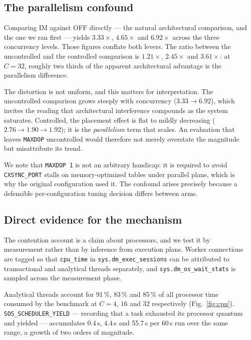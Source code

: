 \documentclass[conference,a4paper]{IEEEtran}
\begin{document}
\subsection{The parallelism confound}
\label{sec:confound}

Comparing IM against OFF directly --- the natural architectural comparison, and
the one we ran first --- yields $3.33\times$, $4.65\times$ and $6.92\times$
across the three concurrency levels. Those figures conflate both levers. The
ratio between the uncontrolled and the controlled comparison is $1.21\times$,
$2.45\times$ and $3.61\times$: at $C = 32$, roughly two thirds of the apparent
architectural advantage is the parallelism difference.

The distortion is not uniform, and this matters for interpretation. The
uncontrolled comparison grows steeply with concurrency ($3.33 \rightarrow 6.92$),
which invites the reading that architectural interference compounds as the
system saturates. Controlled, the placement effect is flat to mildly decreasing
($2.76 \rightarrow 1.90 \rightarrow 1.92$); it is the \emph{parallelism} term
that scales. An evaluation that leaves \texttt{MAXDOP} uncontrolled would
therefore not merely overstate the magnitude but misattribute its trend.

We note that \texttt{MAXDOP 1} is not an arbitrary handicap: it is required to
avoid \texttt{CXSYNC\_PORT} stalls on memory-optimized tables under parallel
plans, which is why the original configuration used it. The confound arises
precisely because a defensible per-configuration tuning decision differs
between arms.

\subsection{Direct evidence for the mechanism}

The contention account is a claim about processors, and we test it by
measurement rather than by inference from execution plans. Worker connections
are tagged so that \texttt{cpu\_time} in \texttt{sys.dm\_exec\_sessions} can be
attributed to transactional and analytical threads separately, and
\texttt{sys.dm\_os\_wait\_stats} is sampled across the measurement phase.

Analytical threads account for 91\,\%, 83\,\% and 85\,\% of all processor time
consumed by the benchmark at $C = 4$, $16$ and $32$ respectively
(Fig.~\ref{fig:cpu}). \texttt{SOS\_SCHEDULER\_YIELD} --- recording that a task
exhausted its processor quantum and yielded --- accumulates 0.4\,s, 4.4\,s and
55.7\,s per 60\,s run over the same range, a growth of two orders of magnitude.
\end{document}
